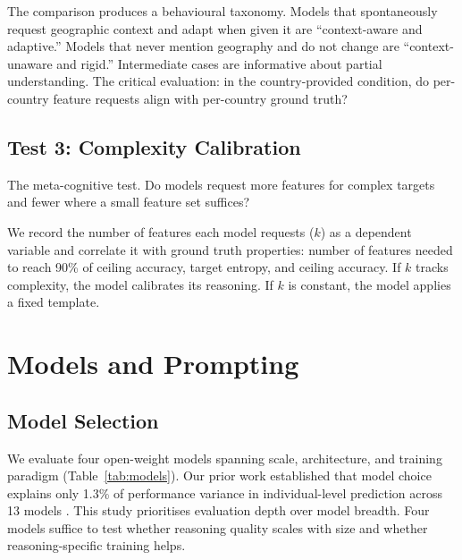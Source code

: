 \documentclass[11pt]{article}
\begin{document}
The comparison produces a behavioural taxonomy. Models that spontaneously request geographic context and adapt when given it are ``context-aware and adaptive.'' Models that never mention geography and do not change are ``context-unaware and rigid.'' Intermediate cases are informative about partial understanding. The critical evaluation: in the country-provided condition, do per-country feature requests align with per-country ground truth?

\subsection{Test 3: Complexity Calibration}

The meta-cognitive test. Do models request more features for complex targets and fewer where a small feature set suffices?

We record the number of features each model requests ($k$) as a dependent variable and correlate it with ground truth properties: number of features needed to reach 90\% of ceiling accuracy, target entropy, and ceiling accuracy. If $k$ tracks complexity, the model calibrates its reasoning. If $k$ is constant, the model applies a fixed template.


\section{Models and Prompting}
\label{sec:models}

\subsection{Model Selection}

We evaluate four open-weight models spanning scale, architecture, and training paradigm (Table~\ref{tab:models}). Our prior work established that model choice explains only 1.3\% of performance variance in individual-level prediction across 13 models \citep{paper1}. This study prioritises evaluation depth over model breadth. Four models suffice to test whether reasoning quality scales with size and whether reasoning-specific training helps.
\end{document}
